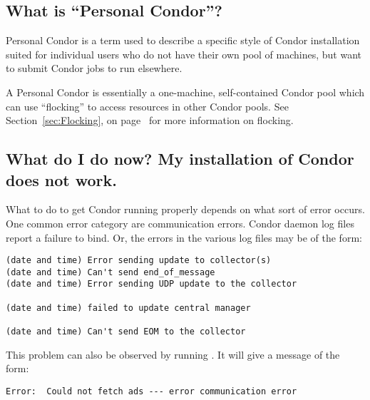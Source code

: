 %


\subsection{What is ``Personal Condor''?}

Personal Condor is a term used to describe a specific style of Condor
installation suited for individual users who do not have their own
pool of machines, but want to submit Condor jobs to run elsewhere.

A Personal Condor is essentially a one-machine, self-contained Condor
pool which can use ``flocking'' to access resources in other Condor
pools.
See Section~\ref{sec:Flocking}, on page~\pageref{sec:Flocking} for
more information on flocking.


\subsection{What do I do now? My installation of Condor does not work.}

What to do to get Condor running properly depends on what sort of
error occurs. 
One common error category are communication errors.
Condor daemon log files report a failure to bind.
Or, the errors in the various log files may be of the form:

\begin{verbatim}
(date and time) Error sending update to collector(s)
(date and time) Can't send end_of_message
(date and time) Error sending UDP update to the collector

(date and time) failed to update central manager

(date and time) Can't send EOM to the collector
\end{verbatim}

This problem can also be observed by running .
It will give a message of the form:
\begin{verbatim}
Error:  Could not fetch ads --- error communication error
\end{verbatim}

